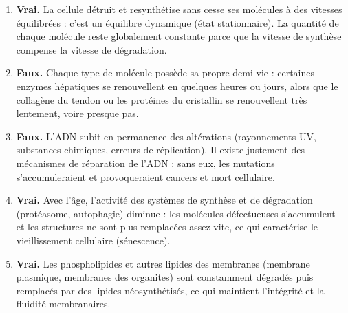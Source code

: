\documentclass[11pt]{article}
\newcommand{\cle}[1]{{\popxbold\color{popdark}#1}}
\begin{document}
\begin{corrige}
\begin{enumerate}
\item \textbf{Vrai.} La cellule détruit et resynthétise sans cesse ses molécules à des vitesses équilibrées : c'est un \cle{équilibre dynamique} (état stationnaire). La quantité de chaque molécule reste globalement constante parce que la vitesse de synthèse compense la vitesse de dégradation.
\item \textbf{Faux.} Chaque type de molécule possède sa propre demi-vie : certaines enzymes hépatiques se renouvellent en quelques heures ou jours, alors que le collagène du tendon ou les protéines du cristallin se renouvellent très lentement, voire presque pas.
\item \textbf{Faux.} L'ADN subit en permanence des altérations (rayonnements UV, substances chimiques, erreurs de réplication). Il existe justement des \cle{mécanismes de réparation de l'ADN} ; sans eux, les mutations s'accumuleraient et provoqueraient cancers et mort cellulaire.
\item \textbf{Vrai.} Avec l'âge, l'activité des systèmes de synthèse et de dégradation (protéasome, autophagie) diminue : les molécules défectueuses s'accumulent et les structures ne sont plus remplacées assez vite, ce qui caractérise le \cle{vieillissement cellulaire} (sénescence).
\item \textbf{Vrai.} Les phospholipides et autres lipides des membranes (membrane plasmique, membranes des organites) sont constamment dégradés puis remplacés par des lipides néosynthétisés, ce qui maintient l'intégrité et la fluidité membranaires.
\end{enumerate}
\end{corrige}
\end{document}
